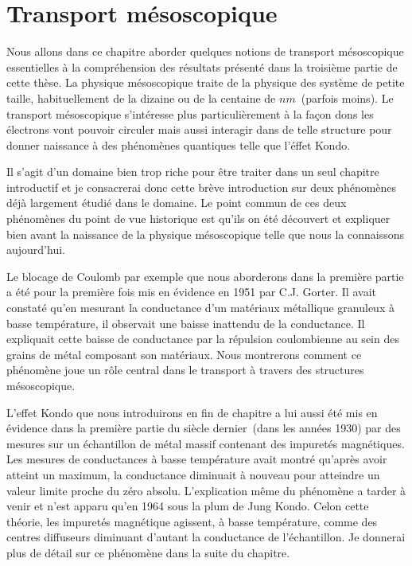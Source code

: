 


\chapter{Transport mésoscopique}

Nous allons dans ce chapitre aborder quelques notions de transport mésoscopique essentielles à la compréhension des résultats présenté dans la troisième partie de cette thèse. La physique mésoscopique traite de la physique des système de petite taille, habituellement de la dizaine ou de la centaine de $nm$~(parfois moins). Le transport mésoscopique s'intéresse plus particulièrement à la façon dons les électrons vont pouvoir circuler mais aussi interagir dans de telle structure pour donner naissance à des phénomènes quantiques telle que l'éffet Kondo. 

Il s'agit d'un domaine bien trop riche pour être traiter dans un seul chapitre introductif et je consacrerai donc cette brève introduction sur deux phénomènes déjà largement étudié dans le domaine. Le point commun de ces deux phénomènes du point de vue historique est qu'ils on été découvert et expliquer bien avant la naissance de la physique mésoscopique telle que nous la connaissons aujourd'hui.

Le blocage de Coulomb par exemple que nous aborderons dans la première partie a été pour la première fois mis en évidence en 1951 par C.J. Gorter. Il avait constaté qu'en mesurant la conductance d'un matériaux métallique granuleux à basse température, il observait une baisse inattendu de la conductance. Il expliquait cette baisse de conductance par la répulsion coulombienne au sein des grains de métal composant son matériaux. Nous montrerons comment ce phénomène joue un rôle central dans le transport à travers des structures mésoscopique.

L'effet Kondo que nous introduirons en fin de chapitre a lui aussi été mis en évidence dans la première partie du siècle dernier~(dans les années 1930) par des mesures sur un échantillon de métal massif contenant des impuretés magnétiques. Les mesures de conductances à basse température avait montré qu'après avoir atteint un maximum, la conductance diminuait à nouveau pour atteindre un valeur limite proche du zéro absolu. L'explication même du phénomène a tarder à venir et n'est apparu qu'en 1964 sous la plum de Jung Kondo. Celon cette théorie, les impuretés magnétique agissent, à basse température, comme des centres diffuseurs diminuant d'autant la conductance de l'échantillon. Je donnerai plus de détail sur ce phénomène dans la suite du chapitre.

